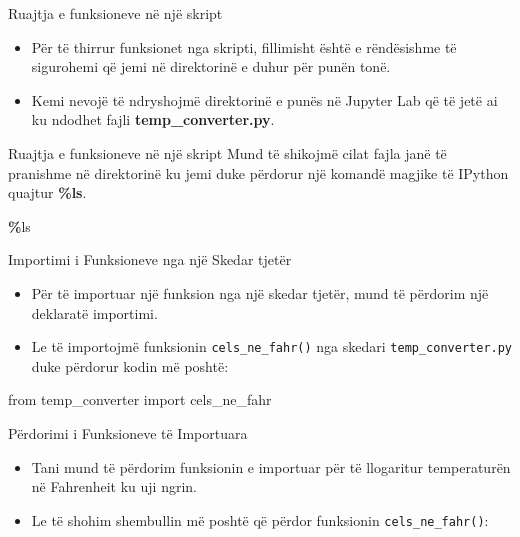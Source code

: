 \documentclass[
  ignorenonframetext,
]{beamer}
\newenvironment{Shaded}{\begin{snugshade}}{\end{snugshade}}
\newcommand{\ImportTok}[1]{#1}
\newcommand{\NormalTok}[1]{#1}
\newcommand{\OperatorTok}[1]{\textcolor[rgb]{0.81,0.36,0.00}{\textbf{#1}}}
\begin{document}
\begin{frame}{Ruajtja e funksioneve në një skript}
\protect\hypertarget{ruajtja-e-funksioneve-nuxeb-njuxeb-skript-2}{}
\begin{itemize}
\item
  Për të thirrur funksionet nga skripti, fillimisht është e rëndësishme
  të sigurohemi që jemi në direktorinë e duhur për punën tonë.
\item
  Kemi nevojë të ndryshojmë direktorinë e punës në Jupyter Lab që të
  jetë ai ku ndodhet fajli \textbf{temp\_converter.py}.
\end{itemize}
\end{frame}

\begin{frame}[fragile]{Ruajtja e funksioneve në një skript}
\protect\hypertarget{ruajtja-e-funksioneve-nuxeb-njuxeb-skript-3}{}
Mund të shikojmë cilat fajla janë të pranishme në direktorinë ku jemi
duke përdorur një komandë magjike të IPython quajtur \textbf{\%ls}.

\begin{Shaded}
\begin{Highlighting}[]
\OperatorTok{\%}\NormalTok{ls}
\end{Highlighting}
\end{Shaded}
\end{frame}

\begin{frame}[fragile]{Importimi i Funksioneve nga një Skedar tjetër}
\protect\hypertarget{importimi-i-funksioneve-nga-njuxeb-skedar-tjetuxebr}{}
\begin{itemize}
\item
  Për të importuar një funksion nga një skedar tjetër, mund të përdorim
  një deklaratë importimi.
\item
  Le të importojmë funksionin \texttt{cels\_ne\_fahr()} nga skedari
  \texttt{temp\_converter.py} duke përdorur kodin më poshtë:
\end{itemize}

\begin{Shaded}
\begin{Highlighting}[]
\ImportTok{from}\NormalTok{ temp\_converter }\ImportTok{import}\NormalTok{ cels\_ne\_fahr}
\end{Highlighting}
\end{Shaded}
\end{frame}

\begin{frame}[fragile]{Përdorimi i Funksioneve të Importuara}
\protect\hypertarget{puxebrdorimi-i-funksioneve-tuxeb-importuara}{}
\begin{itemize}
\item
  Tani mund të përdorim funksionin e importuar për të llogaritur
  temperaturën në Fahrenheit ku uji ngrin.
\item
  Le të shohim shembullin më poshtë që përdor funksionin
  \texttt{cels\_ne\_fahr()}:
\end{itemize}
\end{frame}
\end{document}
